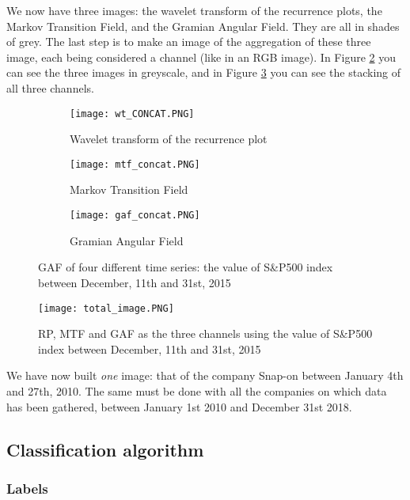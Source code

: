 \documentclass[11pt]{article}
\begin{document}
\begin{onehalfspace}
We now have three images: the wavelet transform of the recurrence plots, the Markov Transition Field, and the Gramian Angular Field. They are all in shades of grey. The last step is to make an image of the aggregation of these three image, each being considered a channel (like in an RGB image). In Figure \ref{fig:3channels} you can see the three images in greyscale, and in Figure \ref{fig:final_image} you can see the stacking of all three channels. 

\begin{figure}[h!]
    \centering
    \captionsetup{justification=centering}
    \begin{subfigure}{0.32\textwidth}
        \texttt{[image: wt\_CONCAT.PNG]}
        \caption{Wavelet transform of the recurrence plot}
        \label{fig:open_concat}
    \end{subfigure}
    \begin{subfigure}{0.32\textwidth}
        \texttt{[image: mtf\_concat.PNG]}
        \caption{Markov Transition Field}
    \end{subfigure}
    \begin{subfigure}{0.32\textwidth}
        \texttt{[image: gaf\_concat.PNG]}
        \caption{Gramian Angular Field}
    \end{subfigure}    
    \caption{GAF of four different time series: the value of S\&P500 index between December, 11th and 31st, 2015}
    \label{fig:3channels}
\end{figure}

\begin{figure}[h!]
    \centering
    \captionsetup{justification=centering}
    \texttt{[image: total\_image.PNG]}
    \caption{RP, MTF and GAF as the three channels using the value of S\&P500 index between December, 11th and 31st, 2015}
\label{fig:final_image}
\end{figure}

We have now built \textit{one} image: that of the company Snap-on between January 4th and 27th, 2010. The same must be done with all the companies on which data has been gathered, between January 1st 2010 and December 31st 2018.


\subsection{Classification algorithm}

\subsubsection{Labels}


\end{onehalfspace}
\end{document}

